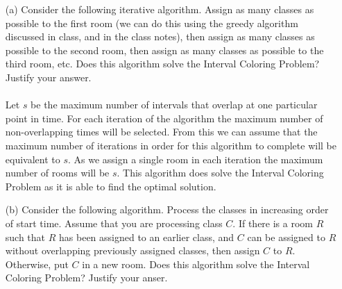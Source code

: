 \documentclass[10pt]{article}
\begin{document}
	\begin{enumerate}
		\item[(a)] Consider the following iterative algorithm. Assign as many classes as possible to the
		first room (we can do this using the greedy algorithm discussed in class, and in the class notes),
		then assign as many classes as possible to the second room, then assign as many classes as possible
		to the third room, etc. Does this algorithm solve the Interval Coloring Problem? Justify your answer.\\
		\\
		Let $s$ be the maximum number of intervals that overlap at one particular point in time. For each iteration
		of the algorithm the maximum number of non-overlapping times will be selected. From this we can assume that
		the maximum number of iterations in order for this algorithm to complete will be equivalent to $s$. As we 
		assign a single room in each iteration the maximum number of rooms will be $s$. This algorithm does solve 
		the Interval Coloring Problem as it is able to find the optimal solution.
		 
		\item[(b)] Consider the following algorithm. Process the classes in increasing order of start time. Assume
		that you are processing class $C$. If there is a room $R$ such that $R$ has been assigned to an earlier
		class, and $C$ can be assigned to $R$ without overlapping previously assigned classes, then assign $C$ to
		$R$. Otherwise, put $C$ in a new room. Does this algorithm solve the Interval Coloring Problem? Justify your anser.
	\end{enumerate}
\end{document}
